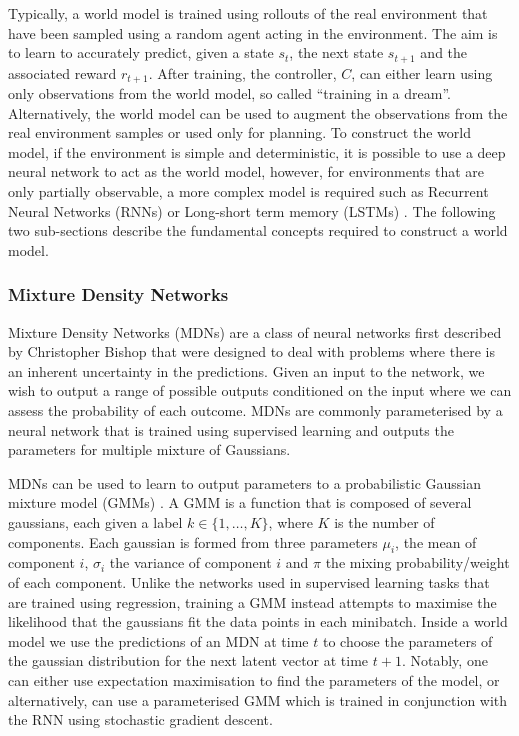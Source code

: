 Typically, a world model is trained using rollouts of the real environment that have been sampled using a random agent acting in the environment. The aim is to learn to accurately predict, given a state $s_t$, the next state $s_{t+1}$ and the associated reward $r_{t+1}$. After training, the controller, $C$, can either learn using only observations from the world model, so called ``training in a dream''. Alternatively, the world model can be used to augment the observations from the real environment samples or used only for planning. To construct the world model, if the environment is simple and deterministic, it is possible to use a deep neural network to act as the world model, however, for environments that are only partially observable, a more complex model is required such as Recurrent Neural Networks (RNNs) \cite{650093, Hochreiter:01book} or Long-short term memory (LSTMs) \cite{hochreiter1997long, gers1999learning}. The following two sub-sections describe the fundamental concepts required to construct a world model.

\subsubsection{Mixture Density Networks}
Mixture Density Networks (MDNs) are a class of neural networks first described by Christopher Bishop \cite{bishop1994mixture} that were designed to deal with problems where there is an inherent uncertainty in the predictions. Given an input to the network, we wish to output a range of possible outputs conditioned on the input where we can assess the probability of each outcome. MDNs are commonly parameterised by a neural network that is trained using supervised learning and outputs the parameters for multiple mixture of Gaussians.

MDNs can be used to learn to output parameters to a probabilistic Gaussian mixture model (GMMs) \cite{bishop1994mixture}. A GMM is a function that is composed of several gaussians, each given a label $k \in \lbrace 1, \ldots, K \rbrace$, where $K$ is the number of components. Each gaussian is formed from three parameters $\mu_i$, the mean of component $i$, $\sigma_i$ the variance of component $i$ and $\pi$ the mixing probability/weight of each component. Unlike the networks used in supervised learning tasks that are trained using regression, training a GMM instead attempts to maximise the likelihood that the gaussians fit the data points in each minibatch. Inside a world model we use the predictions of an MDN at time $t$ to choose the parameters of the gaussian distribution for the next latent vector at time $t+1$. Notably, one can either use expectation maximisation to find the parameters of the model, or alternatively, can use a parameterised GMM which is trained in conjunction with the RNN using stochastic gradient descent.

